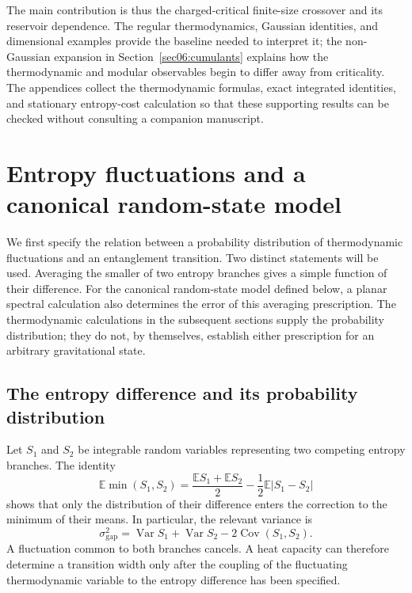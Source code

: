 \documentclass[11pt,letterpaper]{article}
\newcommand{\E}{\mathbb{E}}
\DeclareMathOperator{\Var}{Var}
\DeclareMathOperator{\Cov}{Cov}
\theoremstyle{plain}
\theoremstyle{definition}
\theoremstyle{remark}
\begin{document}
The main contribution is thus the charged-critical finite-size crossover and its reservoir dependence. The regular thermodynamics, Gaussian identities, and dimensional examples provide the baseline needed to interpret it; the non-Gaussian expansion in Section~\ref{sec06:cumulants} explains how the thermodynamic and modular observables begin to differ away from criticality. The appendices collect the thermodynamic formulas, exact integrated identities, and stationary entropy-cost calculation so that these supporting results can be checked without consulting a companion manuscript.

\section{Entropy fluctuations and a canonical random-state model}
\label{sec02:model}

We first specify the relation between a probability distribution of thermodynamic fluctuations and an entanglement transition. Two distinct statements will be used. Averaging the smaller of two entropy branches gives a simple function of their difference. For the canonical random-state model defined below, a planar spectral calculation also determines the error of this averaging prescription. The thermodynamic calculations in the subsequent sections supply the probability distribution; they do not, by themselves, establish either prescription for an arbitrary gravitational state.

\subsection{The entropy difference and its probability distribution}

Let $S_1$ and $S_2$ be integrable random variables representing two competing entropy branches. The identity
\begin{equation}
 \E\min(S_1,S_2)
 =\frac{\E S_1+\E S_2}{2}-\frac12\E|S_1-S_2|
 \label{eq02:two_branches}
\end{equation}
shows that only the distribution of their difference enters the correction to the minimum of their means. In particular, the relevant variance is
\begin{equation}
 \sigma_{\mathrm{gap}}^2
 =\Var S_1+\Var S_2-2\Cov(S_1,S_2).
 \label{eq02:gap_variance}
\end{equation}
A fluctuation common to both branches cancels. A heat capacity can therefore determine a transition width only after the coupling of the fluctuating thermodynamic variable to the entropy difference has been specified.
\end{document}
